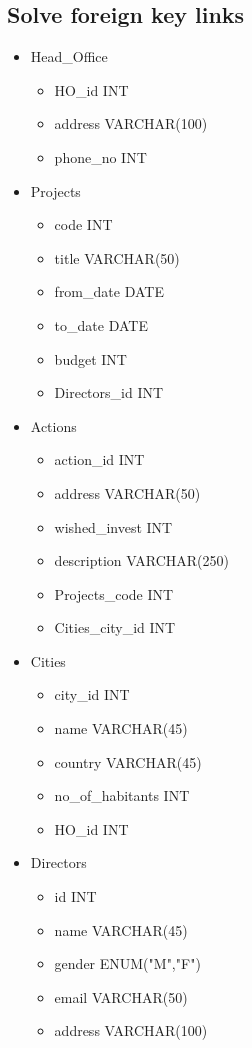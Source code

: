 \documentclass{article}
\begin{document}
\subsection{Solve foreign key links}
\begin{itemize}
	\item Head\_Office
	\begin{itemize}
		\item HO\_id INT
		\item address VARCHAR(100)
		\item phone\_no INT
	\end{itemize}
	\item Projects
		\begin{itemize}
		\item code INT
		\item title VARCHAR(50)
		\item from\_date DATE
		\item to\_date DATE
		\item budget INT
		\item Directors\_id INT
	\end{itemize}
	\item Actions
		\begin{itemize}
		\item action\_id INT
		\item address VARCHAR(50)
		\item wished\_invest INT
		\item description VARCHAR(250)
		\item Projects\_code INT
		\item Cities\_city\_id INT
	\end{itemize}
	\item Cities
		\begin{itemize}
		\item city\_id INT
		\item name VARCHAR(45)
		\item country VARCHAR(45)
		\item no\_of\_habitants INT
		\item HO\_id INT
	\end{itemize}
	\item Directors
		\begin{itemize}
		\item id INT
		\item name VARCHAR(45)
		\item gender ENUM("M","F")
		\item email VARCHAR(50)
		\item address VARCHAR(100)

\end{itemize}
\end{itemize}
\end{document}
